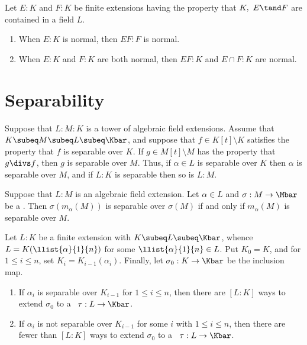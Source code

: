 \documentclass{article}
\begin{document}
  \begin{ttheorem}
    Let \( E:K \) and \( F:K \) be finite extensions having the property that \( K,\ E\tand F \) are contained in a field \( L \).
    \begin{enumerate}[label=(\alph*)]
      \item When \( E:K \) is normal, then \( EF:F \) is normal.
      \item When \( E:K \) and \( F:K \) are both normal, then \( EF:K \) and \( E\cap F:K \) are normal.
    \end{enumerate}
  \end{ttheorem}

\section{Separability}
  \begin{tproposition}
    Suppose that \( L:M:K \) is a tower of algebraic field extensions. Assume that \( K\subeq M\subeq L\subeq \Kbar \), and suppose that \( f\in K[t]\setminus K \) satisfies the property that \( f \) is separable over \( K \). If \( g\in M[t]\setminus M \) has the property that \( g\divs f \), then \( g \) is separable over \( M \). Thus, if \( \alpha\in L \) is separable over \( K \) then \( \alpha \) is separable over \( M \), and if \( L:K \) is separable then so is \( L:M \).
  \end{tproposition}

  \begin{tproposition}
    Suppose that \( L:M \) is an algebraic field extension. Let \( \alpha\in L \) and \( \sigma:M\to\Mbar \) be a \homo. Then \( \sigma(m_\alpha(M)) \) is separable over \( \sigma(M) \) if and only if \( m_\alpha(M) \) is separable over \( M \).
  \end{tproposition}

  \begin{ttheorem}
    Let \( L:K \) be a finite extension with \( K\subeq L\subeq \Kbar \), whence \( L=K(\llist{\alpha}{1}{n}) \) for some \( \llist{\alpha}{1}{n}\in L \). Put \( K_0=K \), and for \( 1\leq i\leq n \), set \( K_i=K_{i-1}(\alpha_i) \). Finally, let \( \sigma_0:K\to\Kbar \) be the inclusion map.
    \begin{enumerate}[label=(\roman*)]
      \item If \( \alpha_i \) is separable over \( K_{i-1} \) for \( 1\leq i\leq n \), then there are \( [L:K] \) ways to extend \( \sigma_0 \) to a \homo~\( \tau:L\to\Kbar \).
      \item If \( \alpha_i \) is not separable over \( K_{i-1} \) for some \( i \) with \( 1\leq i\leq n \), then there are fewer than \( [L:K] \) ways to extend \( \sigma_0 \) to a \homo~\( \tau:L\to\Kbar \).
    \end{enumerate}
  \end{ttheorem}
\end{document}
